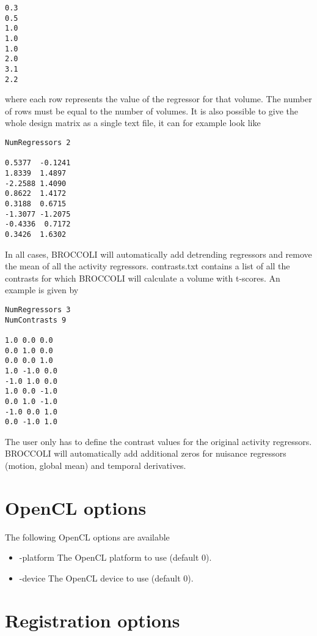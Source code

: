\begin{verbatim}
0.3
0.5
1.0
1.0
1.0
2.0
3.1
2.2
\end{verbatim}
where each row represents the value of the regressor for that volume. The number of rows must be equal to the number of volumes. It is also possible to give the whole design matrix as a single text file, it can for example look like
\begin{verbatim}
NumRegressors 2

0.5377  -0.1241	
1.8339  1.4897
-2.2588 1.4090
0.8622  1.4172
0.3188  0.6715
-1.3077 -1.2075	
-0.4336  0.7172
0.3426  1.6302
\end{verbatim}
In all cases, BROCCOLI will automatically add detrending regressors and remove the mean of all the activity regressors. \newline \newline contrasts.txt contains a list of all the contrasts for which BROCCOLI will calculate a volume with t-scores. An example is given by

\begin{verbatim}
NumRegressors 3
NumContrasts 9

1.0 0.0 0.0
0.0 1.0 0.0
0.0 0.0 1.0
1.0 -1.0 0.0
-1.0 1.0 0.0
1.0 0.0 -1.0
0.0 1.0 -1.0
-1.0 0.0 1.0
0.0 -1.0 1.0
\end{verbatim}
The user only has to define the contrast values for the original activity regressors. BROCCOLI will automatically add additional zeros for nuisance regressors (motion, global mean) and temporal derivatives.

\section{OpenCL options}

The following OpenCL options are available

\begin{itemize}

\item -platform
\newline \newline The OpenCL platform to use (default 0).

\item -device
\newline \newline The OpenCL device to use (default 0).

\end{itemize}

\section{Registration options}

